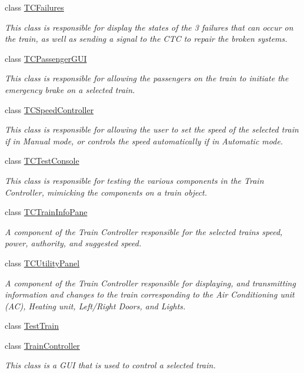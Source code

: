 \begin{DoxyCompactItemize}
class \hyperlink{classTrainControllerComps_1_1TCFailures}{T\+C\+Failures}
\begin{DoxyCompactList}\small\item\em This class is responsible for display the states of the 3 failures that can occur on the train, as well as sending a signal to the C\+TC to repair the broken systems. \end{DoxyCompactList}\item 
class \hyperlink{classTrainControllerComps_1_1TCPassengerGUI}{T\+C\+Passenger\+G\+UI}
\begin{DoxyCompactList}\small\item\em This class is responsible for allowing the passengers on the train to initiate the emergency brake on a selected train. \end{DoxyCompactList}\item 
class \hyperlink{classTrainControllerComps_1_1TCSpeedController}{T\+C\+Speed\+Controller}
\begin{DoxyCompactList}\small\item\em This class is responsible for allowing the user to set the speed of the selected train if in Manual mode, or controls the speed automatically if in Automatic mode. \end{DoxyCompactList}\item 
class \hyperlink{classTrainControllerComps_1_1TCTestConsole}{T\+C\+Test\+Console}
\begin{DoxyCompactList}\small\item\em This class is responsible for testing the various components in the Train Controller, mimicking the components on a train object. \end{DoxyCompactList}\item 
class \hyperlink{classTrainControllerComps_1_1TCTrainInfoPane}{T\+C\+Train\+Info\+Pane}
\begin{DoxyCompactList}\small\item\em A component of the Train Controller responsible for the selected train\textquotesingle{}s speed, power, authority, and suggested speed. \end{DoxyCompactList}\item 
class \hyperlink{classTrainControllerComps_1_1TCUtilityPanel}{T\+C\+Utility\+Panel}
\begin{DoxyCompactList}\small\item\em A component of the Train Controller responsible for displaying, and transmitting information and changes to the train corresponding to the Air Conditioning unit (AC), Heating unit, Left/\+Right Doors, and Lights. \end{DoxyCompactList}\item 
class \hyperlink{classTrainControllerComps_1_1TestTrain}{Test\+Train}
\item 
class \hyperlink{classTrainControllerComps_1_1TrainController}{Train\+Controller}
\begin{DoxyCompactList}\small\item\em This class is a G\+UI that is used to control a selected train. \end{DoxyCompactList}\end{DoxyCompactItemize}
